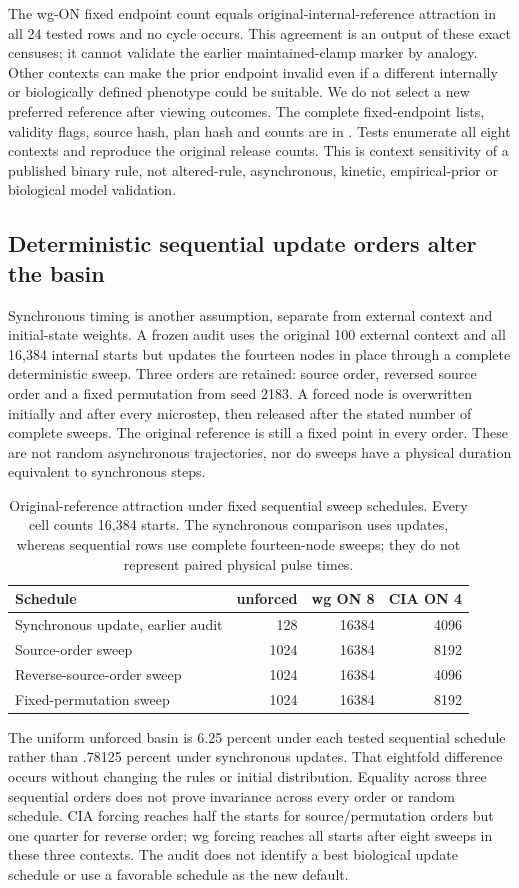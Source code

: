 The wg-ON fixed endpoint count equals original-internal-reference attraction in all 24 tested rows and no cycle occurs. This agreement is an output of these exact censuses; it cannot validate the earlier maintained-clamp marker by analogy. Other contexts can make the prior endpoint invalid even if a different internally or biologically defined phenotype could be suitable. We do not select a new preferred reference after viewing outcomes. The complete fixed-endpoint lists, validity flags, source hash, plan hash and counts are in . Tests enumerate all eight contexts and reproduce the original release counts. This is context sensitivity of a published binary rule, not altered-rule, asynchronous, kinetic, empirical-prior or biological model validation.

\subsection{Deterministic sequential update orders alter the basin}
Synchronous timing is another assumption, separate from external context and initial-state weights. A frozen audit uses the original 100 external context and all 16,384 internal starts but updates the fourteen nodes in place through a complete deterministic sweep. Three orders are retained: source order, reversed source order and a fixed permutation from seed 2183. A forced node is overwritten initially and after every microstep, then released after the stated number of complete sweeps. The original reference is still a fixed point in every order. These are not random asynchronous trajectories, nor do sweeps have a physical duration equivalent to synchronous steps.
\begin{table}[ht]\centering
\caption{Original-reference attraction under fixed sequential sweep schedules. Every cell counts 16,384 starts. The synchronous comparison uses updates, whereas sequential rows use complete fourteen-node sweeps; they do not represent paired physical pulse times.}
\begin{tabular}{lrrr}\hline
Schedule & unforced & wg ON 8 & CIA ON 4\\\hline
Synchronous update, earlier audit &128&16384&4096\\
Source-order sweep &1024&16384&8192\\
Reverse-source-order sweep &1024&16384&4096\\
Fixed-permutation sweep &1024&16384&8192\\\hline
\end{tabular}\end{table}
The uniform unforced basin is 6.25 percent under each tested sequential schedule rather than .78125 percent under synchronous updates. That eightfold difference occurs without changing the rules or initial distribution. Equality across three sequential orders does not prove invariance across every order or random schedule. CIA forcing reaches half the starts for source/permutation orders but one quarter for reverse order; wg forcing reaches all starts after eight sweeps in these three contexts. The audit does not identify a best biological update schedule or use a favorable schedule as the new default.

